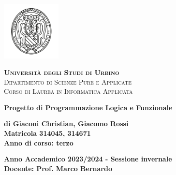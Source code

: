 \documentclass[a4paper,11pt]{article}
\begin{document}
    \begin{center}
        \includegraphics[width=3cm]{Immagini/logo.png}
    \end{center}

    \begin{center}
        \textsc{\textbf{Università degli Studi di Urbino}}\\
        \textsc{Dipartimento di Scienze Pure e Applicate}\\
        \textsc{Corso di Laurea in Informatica Applicata}
    \end{center}

    \vspace{2cm}

    \begin{center}
        \textbf{\Large Progetto di Programmazione Logica e Funzionale}
    \end{center}

    \vspace{2cm}

    \begin{center}
        \textbf{di Giaconi Christian, Giacomo Rossi} \\ %
        \textbf{Matricola 314045, 314671} \\ %
        \textbf{Anno di corso: terzo}
    \end{center}

    \vspace{2cm}

    \begin{center}
        \textbf{Anno Accademico 2023/2024 - Sessione invernale}\\
        \vspace{1cm}
        \textbf{Docente: Prof. Marco Bernardo}
    \end{center}

    \newpage
    \tableofcontents

    \newpage
\end{document}
